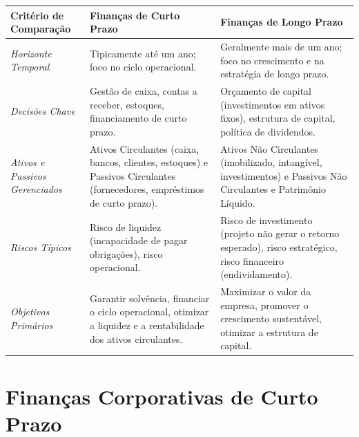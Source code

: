 \documentclass[
  a4paper,
]{book}
\begin{document}
\begin{longtable}[]{@{}
  >{\raggedright\arraybackslash}p{}
  >{\raggedright\arraybackslash}p{}
  >{\raggedright\arraybackslash}p{}@{}}
\toprule\noalign{}
\begin{minipage}[b]{\linewidth}\raggedright
Critério de Comparação
\end{minipage} & \begin{minipage}[b]{\linewidth}\raggedright
Finanças de Curto Prazo
\end{minipage} & \begin{minipage}[b]{\linewidth}\raggedright
Finanças de Longo Prazo
\end{minipage} \\
\midrule\noalign{}
\endhead
\bottomrule\noalign{}
\endlastfoot
\emph{Horizonte Temporal} & Tipicamente até um ano; foco no ciclo
operacional. & Geralmente mais de um ano; foco no crescimento e na
estratégia de longo prazo. \\
\emph{Decisões Chave} & Gestão de caixa, contas a receber, estoques,
financiamento de curto prazo. & Orçamento de capital (investimentos em
ativos fixos), estrutura de capital, política de dividendos. \\
\emph{Ativos e Passivos Gerenciados} & Ativos Circulantes (caixa,
bancos, clientes, estoques) e Passivos Circulantes (fornecedores,
empréstimos de curto prazo). & Ativos Não Circulantes (imobilizado,
intangível, investimentos) e Passivos Não Circulantes e Patrimônio
Líquido. \\
\emph{Riscos Típicos} & Risco de liquidez (incapacidade de pagar
obrigações), risco operacional. & Risco de investimento (projeto não
gerar o retorno esperado), risco estratégico, risco financeiro
(endividamento). \\
\emph{Objetivos Primários} & Garantir solvência, financiar o ciclo
operacional, otimizar a liquidez e a rentabilidade dos ativos
circulantes. & Maximizar o valor da empresa, promover o crescimento
sustentável, otimizar a estrutura de capital. \\
\end{longtable}

\section{Finanças Corporativas de Curto
Prazo}\label{finanuxe7as-corporativas-de-curto-prazo}
\end{document}
